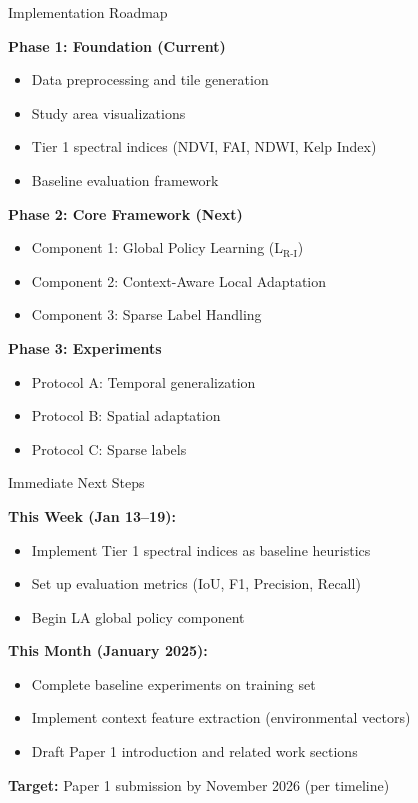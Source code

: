 \documentclass[10pt,xcolor={table,dvipsnames},t]{beamer}
\begin{document}
\begin{frame}{Implementation Roadmap}

\textbf{Phase 1: Foundation (Current)}
\begin{itemize}
  \item[$\checkmark$] Data preprocessing and tile generation
  \item[$\checkmark$] Study area visualizations
  \item[$\square$] Tier 1 spectral indices (NDVI, FAI, NDWI, Kelp Index)
  \item[$\square$] Baseline evaluation framework
\end{itemize}

\vspace{0.5em}
\textbf{Phase 2: Core Framework (Next)}
\begin{itemize}
  \item[$\square$] Component 1: Global Policy Learning (L$_{\text{R-I}}$)
  \item[$\square$] Component 2: Context-Aware Local Adaptation
  \item[$\square$] Component 3: Sparse Label Handling
\end{itemize}

\vspace{0.5em}
\textbf{Phase 3: Experiments}
\begin{itemize}
  \item[$\square$] Protocol A: Temporal generalization
  \item[$\square$] Protocol B: Spatial adaptation
  \item[$\square$] Protocol C: Sparse labels
\end{itemize}

\end{frame}

\begin{frame}{Immediate Next Steps}

\textbf{This Week (Jan 13--19):}
\begin{itemize}
  \item Implement Tier 1 spectral indices as baseline heuristics
  \item Set up evaluation metrics (IoU, F1, Precision, Recall)
  \item Begin LA global policy component
\end{itemize}

\vspace{0.5em}
\textbf{This Month (January 2025):}
\begin{itemize}
  \item Complete baseline experiments on training set
  \item Implement context feature extraction (environmental vectors)
  \item Draft Paper 1 introduction and related work sections
\end{itemize}

\vspace{0.5em}
\textbf{Target:} Paper 1 submission by November 2026 (per timeline)

\end{frame}
\end{document}
